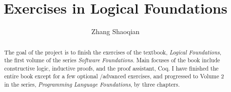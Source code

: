 \documentclass[sigplan]{acmart}\settopmatter{printfolios=true,printccs=false,printacmref=false}
\begin{document}
\title[ZSQLF]{Exercises in Logical Foundations}         %



\author{Zhang Shaoqian}

\begin{abstract}
The goal of the project is to finish the exercises of the textbook, \emph{Logical Foundations}, the
first volume of the series \emph{Software Foundations}.
Main focuses of the book include constructive logic, inductive proofs, and the proof assistant, Coq.
I have finished the entire book except for a few optional \slash advanced exercises, and progressed to
Volume 2 in the series, \emph{Programming Language Foundations}, by three chapters.
\end{abstract}


\maketitle
\end{document}
